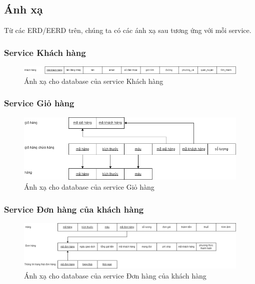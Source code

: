 \subsection{Ánh xạ}
\par Từ các ERD/EERD trên, chúng ta có các ánh xạ sau tương ứng với mỗi service.

\subsubsection{Service Khách hàng}
\begin{figure}[!htp]
    \begin{center}
        \includegraphics[width=1\textwidth]{img/database/mapping/mapping-customer.png}
        \newline
        \caption{Ánh xạ cho database của service Khách hàng}
    \end{center}
\end{figure}

\subsubsection{Service Giỏ hàng}
\begin{figure}[!htp]
    \begin{center}
        \includegraphics[width=1\textwidth]{img/database/mapping/mapping-cart.png}
        \newline
        \caption{Ánh xạ cho database của service Giỏ hàng}
    \end{center}
\end{figure}

\subsubsection{Service Đơn hàng của khách hàng}
\begin{figure}[!htp]
    \begin{center}
        \includegraphics[width=1\textwidth]{img/database/mapping/mapping-customer-order.png}
        \newline
        \caption{Ánh xạ cho database của service Đơn hàng của khách hàng}
    \end{center}
\end{figure}

